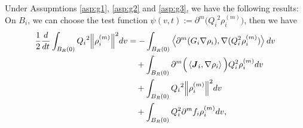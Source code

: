 \documentclass[a4paper, 11pt]{article}
\newcommand{\inner}[2]{\left< #1 , #2 \right>}
\newcounter{results}[section]
\theoremstyle{plain}
\theoremstyle{remark}
\theoremstyle{definition}
\newcommand{\intr}{\int_{B_R(0)}}
\newcommand{\Q}{Q}
\newcommand{\J}{\boldsymbol{J}}
\begin{document}
Under Assupmtions \ref{asp:g1}, \ref{asp:g2} and \ref{asp:g3}, we have the following results: On $B_i$, we can choose the test function $\psi(v,t):=\partial^{m}\Big({\Q_i}^2\rho^{(m)}_i\Big)$, then we have
	\begin{equation}
		\begin{aligned}
			\frac{1}{2}\frac{d}{dt}\intr {\Q_i}^2\norm{\rho_i^{(m)}}^2dv&=-\intr\inner{\partial^m(G_i\nabla\rho_i)}{\nabla(\Q_i^2\rho_i^{(m)})}dv\\
			&\quad+\intr\partial^{m}\Big(\inner{\J_i}{\nabla\rho_i}\Big)\Q_i^2\rho_i^{(m)}dv\\
			&\quad+\intr {\Q_i}^2\norm{\rho_i^{(m)}}^2dv\\
            &\quad+\intr Q_i^2\partial^m f_i\rho_i^{(m)}dv,
		\end{aligned}
	\end{equation}
	
\end{document}
